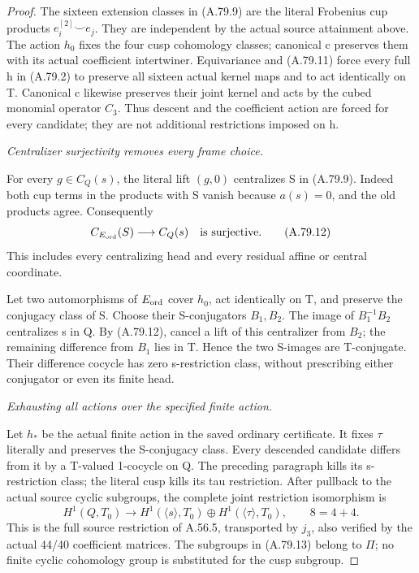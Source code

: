 \begin{proof}
The sixteen extension classes in (A.79.9) are the literal
Frobenius cup products \(e_i^{[2]}\smile e_j\).
They are independent by the actual source attainment above.
The action \(h_0\) fixes the four cusp cohomology classes;
canonical c preserves them with its actual coefficient
intertwiner. Equivariance and (A.79.11) force every full h in
(A.79.2) to preserve all sixteen actual kernel maps and to act
identically on T. Canonical c likewise preserves their joint
kernel and acts by the cubed monomial operator \(C_3\).
Thus descent and the coefficient action are forced for every
candidate; they are not additional restrictions imposed on h.

\emph{Centralizer surjectivity removes every frame choice.}\par
For every \(g\in C_Q(s)\), the literal lift \((g,0)\)
centralizes S in (A.79.9). Indeed both cup terms in the products
with S vanish because \(a(s)=0\), and the old products agree.
Consequently
\[
                  C_{E_{\rm ord}}(S)\longrightarrow C_Q(s)
                   \quad\text{is surjective}.
 \tag{A.79.12}
\]
This includes every centralizing head and every residual affine
or central coordinate.

Let two automorphisms of \(E_{\rm ord}\) cover \(h_0\), act
identically on T, and preserve the conjugacy class of S. Choose
their S-conjugators \(B_1,B_2\). The image of
\(B_1^{-1}B_2\) centralizes s in Q. By (A.79.12), cancel a
lift of this centralizer from \(B_2\); the remaining difference
from \(B_1\) lies in T. Hence the two S-images are T-conjugate.
Their difference cocycle has zero s-restriction class, without
prescribing either conjugator or even its finite head.

\emph{Exhausting all actions over the specified finite action.}\par
Let \(h_*\) be the actual finite action in the saved ordinary
certificate. It fixes \(\tau\) literally and preserves the
S-conjugacy class. Every descended candidate differs from it by
a T-valued 1-cocycle on Q. The preceding paragraph kills its
s-restriction class; the literal cusp kills its tau restriction.
After pullback to the actual source cyclic subgroups, the
complete joint restriction isomorphism is
\[
 H^1(Q,T_0)\longrightarrow
 H^1(\langle s\rangle,T_0)
       \oplus H^1(\langle\tau\rangle,T_0),
 \qquad 8=4+4.
 \tag{A.79.13}
\]
This is the full source restriction of A.56.5, transported by
\(j_3\), also verified by the actual 44/40 coefficient matrices.
The subgroups in (A.79.13) belong to \(\Pi\); no finite cyclic
cohomology group is substituted for the cusp subgroup.


\end{proof}
